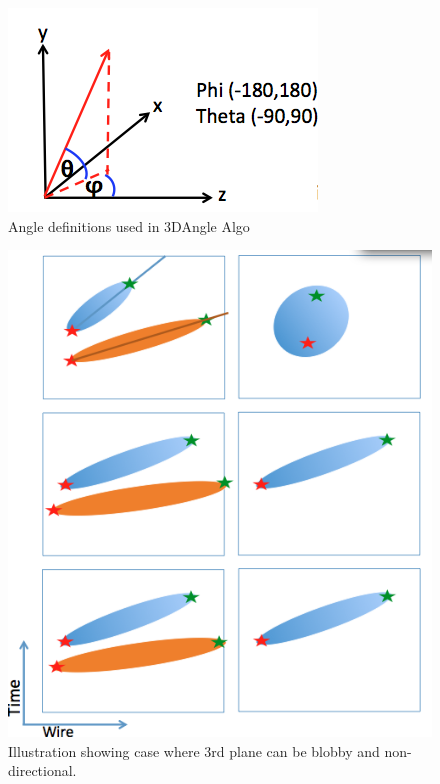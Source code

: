 \documentclass{article}
\begin{document}
\begin{figure}[!h]
\begin{center}
\includegraphics[scale=0.5]{Figures/Angles.png}
\end{center}
\caption{Angle definitions used in 3DAngle Algo }
\label{fig:angle}
\end{figure}

\begin{figure}[!h]
\begin{center}
\includegraphics[scale=0.4]{Figures/MatchAlgo_CFAlgo3DAngle_Description.png}
\end{center}
\caption{Illustration showing case where 3rd plane can be blobby and non-directional. }
\label{fig:angles}
\end{figure}
\end{document}
